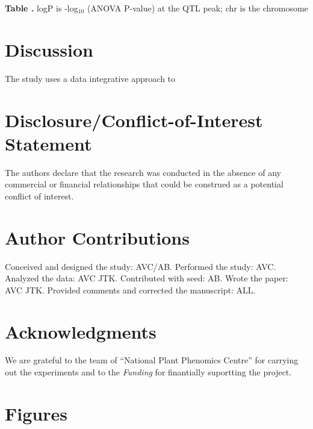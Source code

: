 \documentclass{frontiersSCNS} %
\begin{document}
\begin{table}[ht]
 \textbf{\label{table:qtl} Table .}{ logP is -log$_{10}$ (ANOVA P-value) at the QTL peak; chr is the chromosome}\\

\end{table}


\section{Discussion}

The study uses a data integrative approach to 
\section*{Disclosure/Conflict-of-Interest Statement}


The authors declare that the research was conducted in the absence of any commercial or financial relationships that could be construed as a potential conflict of interest.

\section*{Author Contributions}

Conceived and designed the study: AVC/AB. Performed the study: AVC. Analyzed the data: AVC JTK. Contributed with seed: AB. Wrote the paper: AVC JTK. Provided comments and corrected the manuscript: ALL.

\section*{Acknowledgments}
 We are grateful to the team of “National Plant Phenomics Centre” for carrying out the experiments and to the 
\textit{Funding\textcolon} for finantially suportting the project.






\section*{Figures}
\end{document}
